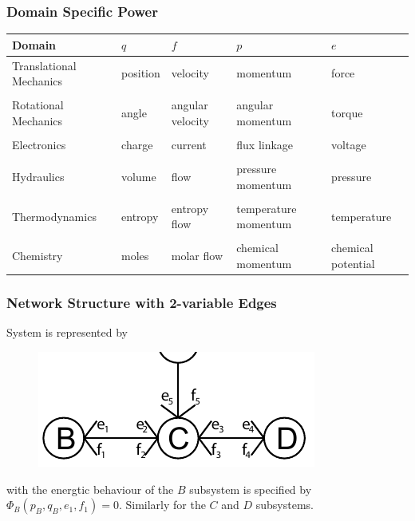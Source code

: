 \documentclass[11pt,reqno]{beamer}
\begin{document}
\begin{frame}
\frametitle{Domain Specific Power}
{\tiny
\begin{tabular}{p{1.5cm} | p{1.75cm} | p{1.75cm} |p{1.75cm} | p{1.75cm}|}
Domain & $q$ & $f$ & $p$ & $e$\\
\hline
Translational Mechanics & position & velocity & momentum & force\\
\hline \\
Rotational Mechanics & angle & angular velocity & angular momentum & torque\\
\hline \\
Electronics & charge  & current & flux linkage & voltage\\
\hline \\
Hydraulics & volume & flow & pressure momentum & pressure\\
\hline \\
Thermodynamics & entropy & entropy flow & temperature momentum & temperature\\
\hline \\
Chemistry & moles & molar flow& chemical momentum & chemical potential\\
\hline 
\end{tabular}}
\end{frame}
\begin{frame}
\frametitle{Network Structure with 2-variable Edges}
System is represented by
\begin{figure}
\includegraphics{images/portbondgraph.pdf}
\end{figure}
with the energtic behaviour of the $B$ subsystem is specified by
$\Phi_B(p_B,q_B,e_1,f_1)= 0$. Similarly for the $C$ and $D$ subsystems.
\end{frame}
\end{document}
